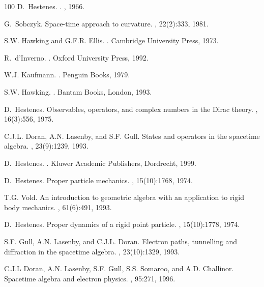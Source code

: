 \documentclass[a4paper]{article}
\numberwithin{equation}{section}
\begin{document}
\begin{thebibliography}{100}
D.~Hestenes.
.
, 1966.

G.~Sobczyk.
\newblock Space-time approach to curvature.
, 22(2):333, 1981.

S.W. Hawking and G.F.R. Ellis.
.
\newblock Cambridge University Press, 1973.

R.~d'Inverno.
.
\newblock Oxford University Press, 1992.

W.J. Kaufmann.
.
\newblock Penguin Books, 1979.

S.W. Hawking.
.
\newblock Bantam Books, London, 1993.

D.~Hestenes.
\newblock Observables, operators, and complex numbers in the {D}irac theory.
, 16(3):556, 1975.

C.J.L. Doran, A.N. Lasenby, and S.F. Gull.
\newblock States and operators in the spacetime algebra.
, 23(9):1239, 1993.

D.~Hestenes.
.
\newblock Kluwer Academic Publishers, Dordrecht, 1999.

D.~Hestenes.
\newblock Proper particle mechanics.
, 15(10):1768, 1974.

T.G. Vold.
\newblock An introduction to geometric algebra with an application to rigid
  body mechanics.
, 61(6):491, 1993.

D.~Hestenes.
\newblock Proper dynamics of a rigid point particle.
, 15(10):1778, 1974.

S.F. Gull, A.N. Lasenby, and C.J.L. Doran.
\newblock Electron paths, tunnelling and diffraction in the spacetime algebra.
, 23(10):1329, 1993.

C.J.L Doran, A.N. Lasenby, S.F. Gull, S.S. Somaroo, and A.D. Challinor.
\newblock Spacetime algebra and electron physics.
, 95:271, 1996.


\end{thebibliography}
\end{document}
